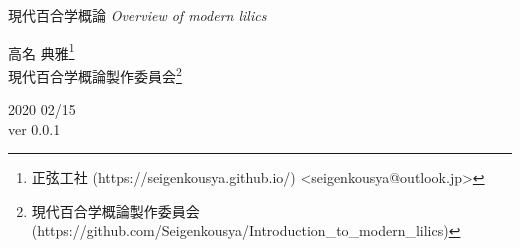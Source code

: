 \documentclass[ %
	uplatex,%
	a5paper,%
	papersize%
	]{jsbook}
\begin{document}

						\begin{titlepage}
							\pagecolor{black}
							\color{white}
							\renewcommand{\thefootnote}{\textcolor{red}{\fnsymbol{footnote}}}
							
							\begin{center}
								\vspace*{20mm}
								\fontsize{36pt}{0pt} \selectfont
								現代百合学概論
								\vspace*{5mm}
								\fontsize{21pt}{3pt} \selectfont
								{\sl Overview of modern lilics}
								\vspace{30mm}

								{\LARGE 高名 典雅\footnote[2]{\color{white}正弦工社 (https://seigenkousya.github.io/) <seigenkousya@outlook.jp>}}
								\vspace{2mm}\\
								\color{white}
								{\LARGE 現代百合学概論製作委員会\footnote[3]{\color{white}現代百合学概論製作委員会(https://github.com/Seigenkousya/Introduction\_to\_modern\_lilics)}}
								\vspace{10mm}\\
		
								\begin{flushright}
									\color{white}
									{\rm \Large 2020 02/15}\vspace{2mm}\\
									{\rm \Large ver 0.0.1}
								\end{flushright}

								\vspace{10mm}
							\end{center}
						\end{titlepage}
\end{document}
